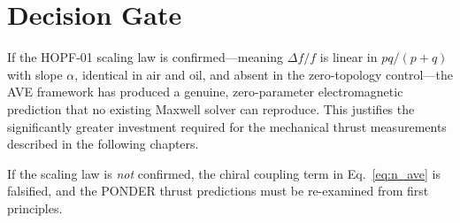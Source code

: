 \section{Decision Gate}

If the HOPF-01 scaling law is confirmed---meaning $\Delta f/f$ is linear in $pq/(p+q)$ with slope $\alpha$, identical in air and oil, and absent in the zero-topology control---the AVE framework has produced a genuine, zero-parameter electromagnetic prediction that no existing Maxwell solver can reproduce. This justifies the significantly greater investment required for the mechanical thrust measurements described in the following chapters.

If the scaling law is \textit{not} confirmed, the chiral coupling term in Eq.~\ref{eq:n_ave} is falsified, and the PONDER thrust predictions must be re-examined from first principles.
